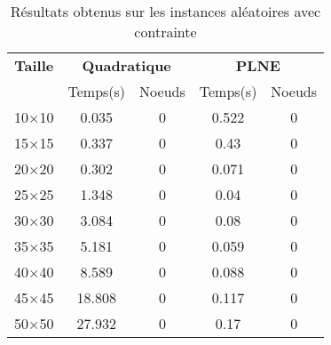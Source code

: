 \documentclass[main.tex]{subfiles}
\begin{document}
\thispagestyle{empty}

\begin{table}[h]
    \centering
    \begin{tabular}{ccccc}
	\hline	
	\textbf{Taille} &\multicolumn{2}{c}{\textbf{Quadratique}} &\multicolumn{2}{c}{\textbf{PLNE}}\\
	 &Temps(s) &Noeuds &Temps(s) &Noeuds\\

\hline
	10$\times$10 &0.035 &0 &0.522 &0\\
	15$\times$15 &0.337 &0 &0.43 &0\\
	20$\times$20 &0.302 &0 &0.071 &0\\
	25$\times$25 &1.348 &0 &0.04 &0\\
	30$\times$30 &3.084 &0 &0.08 &0\\
	35$\times$35 &5.181 &0 &0.059 &0\\
	40$\times$40 &8.589 &0 &0.088 &0\\
	45$\times$45 &18.808 &0 &0.117 &0\\
	50$\times$50 &27.932 &0 &0.17 &0\\
\end{tabular}\caption{Résultats obtenus sur les instances aléatoires avec contrainte}
\end{table}
\end{document}
